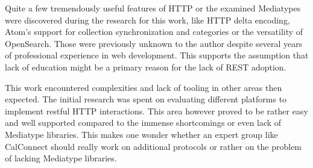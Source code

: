 \documentclass[11pt,a4paper,headsepline,twoside]{scrartcl}		%
\begin{document}
Quite a few tremendously useful features of HTTP or the examined Mediatypes were
discovered during the research for this work, like HTTP delta encoding, Atom's
support for collection synchronization and categories or the versatility of
OpenSearch. Those were previously unknown to the author despite several years of
professional experience in web development. This supports the assumption that
lack of education might be a primary reason for the lack of REST adoption.

This work encountered complexities and lack of tooling in other areas then
expected. The initial research was spent on evaluating different platforms to
implement restful HTTP interactions. This area however proved to be rather easy
and well supported compared to the immense shortcomings or even lack of
Mediatype libraries. This makes one wonder whether an expert group like
CalConnect should really work on additional protocols or rather on the problem
of lacking Mediatype libraries.

\newpage
{}

\end{document}
